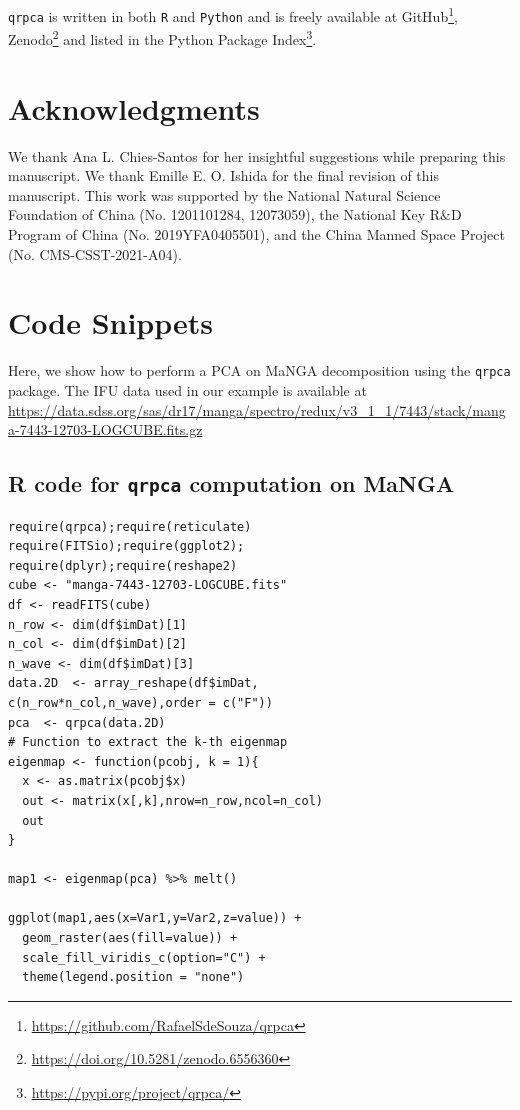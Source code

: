 \documentclass[preprint,authoryear,11pt,5p,times]{elsarticle}
\begin{document}
\texttt{qrpca} is written in both {\tt R} and {\tt Python} and is freely available at GitHub\footnote{ \url{https://github.com/RafaelSdeSouza/qrpca}}, Zenodo\footnote{\url{https://doi.org/10.5281/zenodo.6556360}} and listed in the  
Python Package Index\footnote{\url{https://pypi.org/project/qrpca/}}.


\section*{Acknowledgments}
\label{sec:acknowledgements}
We thank Ana L. Chies-Santos for her insightful suggestions while preparing this manuscript. We thank Emille E. O. Ishida for the final revision of this manuscript. 
This work was supported by the National Natural Science Foundation of China (No. 1201101284, 12073059), the National Key R$\&$D Program of China (No. 2019YFA0405501), and the China Manned Space Project (No. CMS-CSST-2021-A04).



\appendix
\section{Code Snippets}
\label{sec:code}

Here, we show how to perform a PCA on MaNGA decomposition using the \texttt{qrpca} package. The IFU data used in our example is available at \url{https://data.sdss.org/sas/dr17/manga/spectro/redux/v3_1_1/7443/stack/manga-7443-12703-LOGCUBE.fits.gz}

\subsection*{R code for \texttt{qrpca} computation on MaNGA}
\begin{lstlisting}
require(qrpca);require(reticulate)
require(FITSio);require(ggplot2);
require(dplyr);require(reshape2)
cube <- "manga-7443-12703-LOGCUBE.fits"
df <- readFITS(cube)
n_row <- dim(df$imDat)[1]
n_col <- dim(df$imDat)[2]
n_wave <- dim(df$imDat)[3]
data.2D  <- array_reshape(df$imDat,
c(n_row*n_col,n_wave),order = c("F"))
pca  <- qrpca(data.2D)
# Function to extract the k-th eigenmap
eigenmap <- function(pcobj, k = 1){
  x <- as.matrix(pcobj$x)
  out <- matrix(x[,k],nrow=n_row,ncol=n_col)
  out
}

map1 <- eigenmap(pca) %>% melt()

ggplot(map1,aes(x=Var1,y=Var2,z=value)) +
  geom_raster(aes(fill=value)) +
  scale_fill_viridis_c(option="C") +
  theme(legend.position = "none") 
\end{lstlisting}
\end{document}
